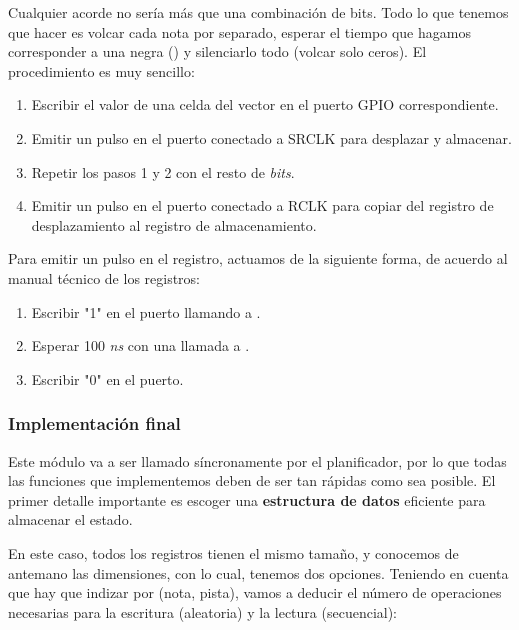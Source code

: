 \smallskip

Cualquier acorde no sería más que una combinación de bits. Todo lo que tenemos que hacer es volcar cada nota por separado, esperar el tiempo que hagamos corresponder a una negra (\quarternote) y silenciarlo todo (volcar solo ceros). El procedimiento es muy sencillo:

\begin{enumerate}
	\item Escribir el valor de una celda del vector en el puerto \acrshort{GPIO} correspondiente.
	\item Emitir un pulso en el puerto conectado a SRCLK para desplazar y almacenar.
	\item Repetir los pasos 1 y 2 con el resto de \textit{bits}.
	\item Emitir un pulso en el puerto conectado a RCLK para copiar del registro de desplazamiento al registro de almacenamiento.
\end{enumerate}

Para emitir un pulso en el registro, actuamos de la siguiente forma, de acuerdo al manual técnico de los registros:

\begin{enumerate}
	\item Escribir "1" en el puerto llamando a .
	\item Esperar 100 \textit{ns} con una llamada a .
	\item Escribir "0" en el puerto.
\end{enumerate}

\subsubsection{Implementación final}

Este módulo va a ser llamado síncronamente por el planificador, por lo que todas las funciones que implementemos deben de ser tan rápidas como sea posible. El primer detalle importante es escoger una \textbf{estructura de datos} eficiente para almacenar el estado.

En este caso, todos los registros tienen el mismo tamaño, y conocemos de antemano las dimensiones, con lo cual, tenemos dos opciones. Teniendo en cuenta que hay que indizar por (nota, pista), vamos a deducir el número de operaciones necesarias para la escritura (aleatoria) y la lectura (secuencial):

